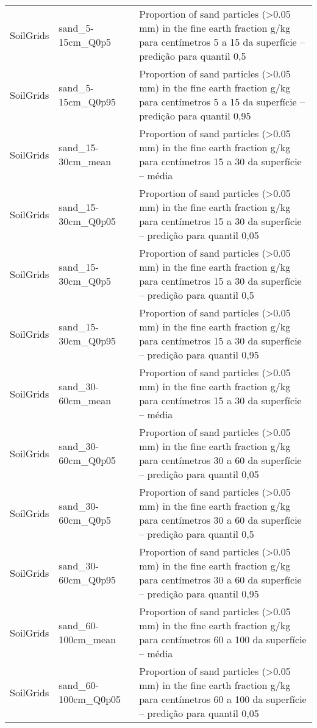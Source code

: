 \begin{longtable}{@{} p{4cm} p{4cm} p{8cm} @{}}
	SoilGrids &
	sand\_5-15cm\_Q0p5 &
	Proportion of sand particles (\textgreater 0.05 mm) in the fine earth fraction g/kg para centímetros 5 a 15 da superfície – predição para quantil 0,5 \\
	SoilGrids &
	sand\_5-15cm\_Q0p95 &
	Proportion of sand particles (\textgreater 0.05 mm) in the fine earth fraction g/kg para centímetros 5 a 15 da superfície – predição para quantil 0,95 \\
	SoilGrids &
	sand\_15-30cm\_mean &
	Proportion of sand particles (\textgreater 0.05 mm) in the fine earth fraction g/kg para centímetros 15 a 30 da superfície – média \\
	SoilGrids &
	sand\_15-30cm\_Q0p05 &
	Proportion of sand particles (\textgreater 0.05 mm) in the fine earth fraction g/kg para centímetros 15 a 30 da superfície – predição para quantil 0,05 \\
	SoilGrids &
	sand\_15-30cm\_Q0p5 &
	Proportion of sand particles (\textgreater 0.05 mm) in the fine earth fraction g/kg para centímetros 15 a 30 da superfície – predição para quantil 0,5 \\
	SoilGrids &
	sand\_15-30cm\_Q0p95 &
	Proportion of sand particles (\textgreater 0.05 mm) in the fine earth fraction g/kg para centímetros 15 a 30 da superfície – predição para quantil 0,95 \\
	SoilGrids &
	sand\_30-60cm\_mean &
	Proportion of sand particles (\textgreater 0.05 mm) in the fine earth fraction g/kg para centímetros 15 a 30 da superfície – média \\
	SoilGrids &
	sand\_30-60cm\_Q0p05 &
	Proportion of sand particles (\textgreater 0.05 mm) in the fine earth fraction g/kg para centímetros 30 a 60 da superfície – predição para quantil 0,05 \\
	SoilGrids &
	sand\_30-60cm\_Q0p5 &
	Proportion of sand particles (\textgreater 0.05 mm) in the fine earth fraction g/kg para centímetros 30 a 60 da superfície – predição para quantil 0,5 \\
	SoilGrids &
	sand\_30-60cm\_Q0p95 &
	Proportion of sand particles (\textgreater 0.05 mm) in the fine earth fraction g/kg para centímetros 30 a 60 da superfície – predição para quantil 0,95 \\
	SoilGrids &
	sand\_60-100cm\_mean &
	Proportion of sand particles (\textgreater 0.05 mm) in the fine earth fraction g/kg para centímetros 60 a 100 da superfície – média \\
	SoilGrids &
	sand\_60-100cm\_Q0p05 &
	Proportion of sand particles (\textgreater 0.05 mm) in the fine earth fraction g/kg para centímetros 60 a 100 da superfície – predição para quantil 0,05 \\

\end{longtable}
